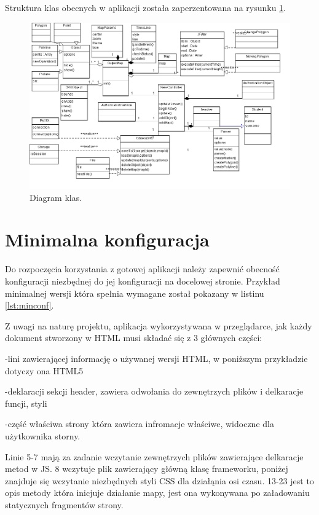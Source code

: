Struktura klas obecnych w aplikacji została zaperzentowana na rysunku \ref{fig:classDiagram2}.

\begin{center}
\begin{figure}[H]
\centering
     \includegraphics[angle=270,origin=c,width=130mm]{ge/smieci/ClassDiagram.png}
      \caption{Diagram klas.}
       \label{fig:classDiagram2}
\end{figure}
\end{center}

\section{Minimalna konfiguracja}
\label{sec:minimum}

Do rozpoczęcia korzystania z gotowej aplikacji należy zapewnić obecność konfiguracji niezbędnej do jej konfiguracji na docelowej stronie. Przykład minimalnej wersji która spełnia wymagane został pokazany w listinu \ref{lst:minconf}.

Z uwagi na naturę projektu, aplikacja wykorzystywana w przeglądarce, jak każdy dokument stworzony w HTML musi składać się z 3 głównych części:


-lini zawierającej informację o używanej wersji HTML, w poniższym przykładzie dotyczy ona HTML5

-deklaracji sekcji header, zawiera odwołania do zewnętrzych plików i delkaracje funcji, styli

-część właściwa strony która zawiera infromacje właściwe, widoczne dla użytkownika storny.

Linie 5-7 mają za zadanie wczytanie zewnętrzych plików zawierające delkaracje metod w JS. 8 wczytuje plik zawierający główną klasę frameworku, poniżej znajduje się wczytanie niezbędnych styli CSS dla działąnia osi czasu. 13-23 jest to opis metody która inicjuje działanie mapy, jest ona wykonywana po załadowaniu statycznych fragmentów strony.

